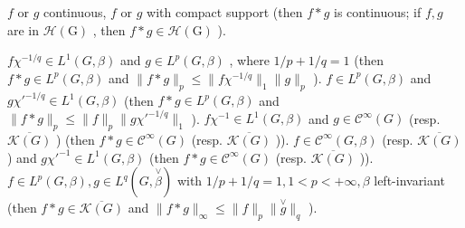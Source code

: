 \(f\) or \(g\) continuous, \(f\) or \(g\) with compact support (then \(f*g\) is continuous; if \(f,g\) are in \(\mathcal{H}(\mathrm{G})\) , then \(f*g\in\mathcal{H}(\mathrm{G})\) ).

\(f\chi^{-1/q} \in L^{1}(G,\beta)\) and \(g \in L^{p}(G,\beta)\) , where \(1/p + 1/q = 1\) (then \(f*g \in L^{p}(G,\beta)\) and \(\|f*g\|_{p} \leqslant \|f\chi^{-1/q}\|_{1} \|g\|_{p}\) ). \(f \in L^{p}(G,\beta)\) and \(g\chi'^{-1/q} \in L^{1}(G,\beta)\) (then \(f*g \in L^{p}(G,\beta)\) and \(\|f*g\|_{p} \leqslant \|f\|_{p} \|g\chi'^{-1/q}\|_{1}\) ). \(f\chi^{-1} \in L^{1}(G,\beta)\) and \(g \in \mathcal{C}^{\infty}(G)\) (resp. \(\overline{\mathcal{K}(G)}\) ) (then \(f*g \in \mathcal{C}^{\infty}(G)\) (resp. \(\overline{\mathcal{K}(G)}\) )). \(f \in \mathcal{C}^{\infty}(G,\beta)\) (resp. \(\overline{\mathcal{K}(G)}\) ) and \(g\chi'^{-1} \in L^{1}(G,\beta)\) (then \(f*g \in \mathcal{C}^{\infty}(G)\) (resp. \(\overline{\mathcal{K}(G)}\) )). \(f \in L^{p}(G,\beta), g \in L^{q}(G, \overset{\vee}{\beta})\) with \(1/p + 1/q = 1, 1 < p < +\infty, \beta\) left-invariant (then \(f*g \in \overline{\mathcal{K}(G)}\) and \(\|f*g\|_{\infty} \leqslant \|f\|_{p} \| \overset{\vee}{g}\|_{q}\) ).
